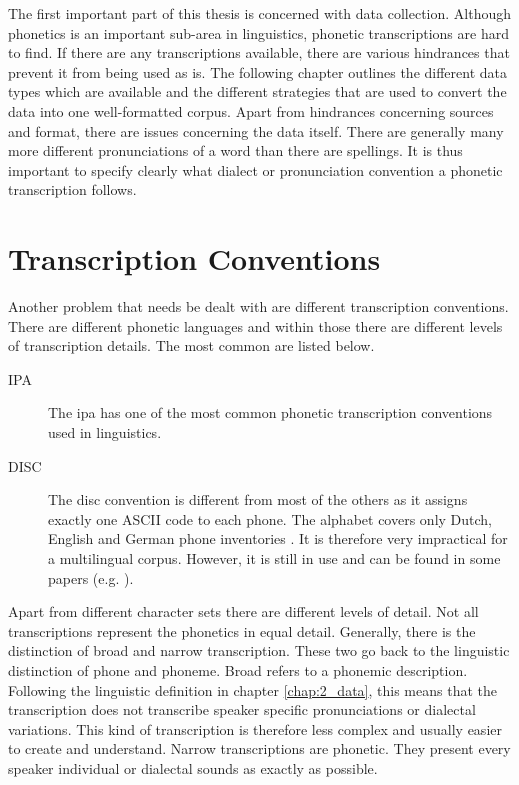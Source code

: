 \label{chap:2_data}
The first important part of this thesis is concerned with data collection. Although phonetics is an important sub-area in linguistics, phonetic transcriptions are hard to find. If there are any transcriptions available, there are various hindrances that prevent it from being used as is. The following chapter outlines the different data types which are available and the different strategies that are used to convert the data into one well-formatted corpus. Apart from hindrances concerning sources and format, there are issues concerning the data itself. There are generally many more different pronunciations of a word than there are spellings. It is thus important to specify clearly what dialect or pronunciation convention a phonetic transcription follows.

\section{Transcription Conventions}
\label{transcb-conventions}
Another problem that needs be dealt with are different transcription conventions. There are different phonetic languages and within those there are different levels of transcription details. The most common are listed below.

\begin{description}
\item[IPA] The \ac{ipa} has one of the most common phonetic transcription conventions used in linguistics. 
\item[DISC] The \ac{disc} convention is different from most of the others as it assigns exactly one ASCII code to each phone. The alphabet covers only Dutch, English and German phone inventories \citep{celex2-documentation}. It is therefore very impractical for a multilingual corpus. However, it is still in use and can be found in some papers (e.g. \cite{Rao2015GraphemetophonemeCU}). 
\end{description}

Apart from different character sets there are different levels of detail. Not all transcriptions represent the phonetics in equal detail. Generally, there is the distinction of broad and narrow transcription. These two go back to the linguistic distinction of phone and phoneme. Broad refers to a phonemic description. Following the linguistic definition in chapter \ref{chap:2_data}, this means that the transcription does not transcribe speaker specific pronunciations or dialectal variations. This kind of transcription is therefore less complex and usually easier to create and understand. Narrow transcriptions are phonetic. They present every speaker individual or dialectal sounds as exactly as possible. 


